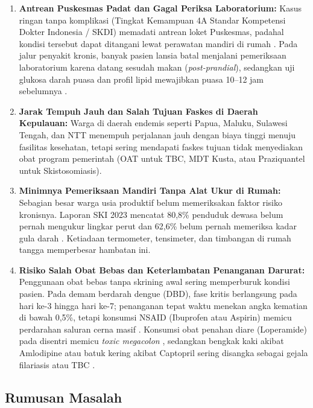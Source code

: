 \begin{enumerate}
    \item \textbf{Antrean Puskesmas Padat dan Gagal Periksa Laboratorium:} Kasus ringan tanpa komplikasi (Tingkat Kemampuan 4A Standar Kompetensi Dokter Indonesia / SKDI) memadati antrean loket Puskesmas, padahal kondisi tersebut dapat ditangani lewat perawatan mandiri di rumah \citep{Kemenkes2022a}. Pada jalur penyakit kronis, banyak pasien lansia batal menjalani pemeriksaan laboratorium karena datang sesudah makan (\textit{post-prandial}), sedangkan uji glukosa darah puasa dan profil lipid mewajibkan puasa 10--12 jam sebelumnya \citep{PERKENI2024}.
    
    \item \textbf{Jarak Tempuh Jauh dan Salah Tujuan Faskes di Daerah Kepulauan:} Warga di daerah endemis seperti Papua, Maluku, Sulawesi Tengah, dan NTT menempuh perjalanan jauh dengan biaya tinggi menuju fasilitas kesehatan, tetapi sering mendapati faskes tujuan tidak menyediakan obat program pemerintah (OAT untuk TBC, MDT Kusta, atau Praziquantel untuk Skistosomiasis).
    
    \item \textbf{Minimnya Pemeriksaan Mandiri Tanpa Alat Ukur di Rumah:} Sebagian besar warga usia produktif belum memeriksakan faktor risiko kronisnya. Laporan SKI 2023 mencatat 80,8\% penduduk dewasa belum pernah mengukur lingkar perut dan 62,6\% belum pernah memeriksa kadar gula darah \citep{Kemenkes2024}. Ketiadaan termometer, tensimeter, dan timbangan di rumah tangga memperbesar hambatan ini.
    
    \item \textbf{Risiko Salah Obat Bebas dan Keterlambatan Penanganan Darurat:} Penggunaan obat bebas tanpa skrining awal sering memperburuk kondisi pasien. Pada demam berdarah dengue (DBD), fase kritis berlangsung pada hari ke-3 hingga hari ke-7; penanganan tepat waktu menekan angka kematian di bawah 0,5\%, tetapi konsumsi NSAID (Ibuprofen atau Aspirin) memicu perdarahan saluran cerna masif \citep{Alam2022,Mohiuddin2023}. Konsumsi obat penahan diare (Loperamide) pada disentri memicu \textit{toxic megacolon} \citep{Koo2007,Schiller2020}, sedangkan bengkak kaki akibat Amlodipine atau batuk kering akibat Captopril sering disangka sebagai gejala filariasis atau TBC \citep{Liang2022,Dicpinigaitis2014}.
\end{enumerate}

\subsection{Rumusan Masalah}

